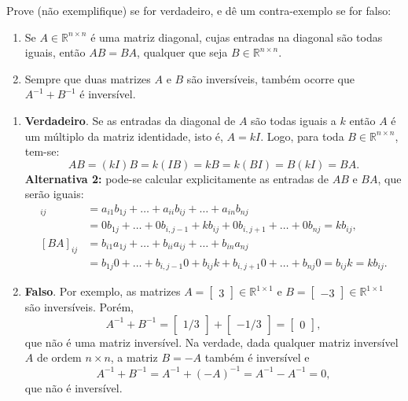 \documentclass[12pt,a4paper]{article}
\newcommand*\R{\mathbb{R}}
\begin{document}
\begin{ExerciseList}
\Exercise[title={2,5}]
Prove (não exemplifique) se for verdadeiro, e dê um contra-exemplo se for falso:
\begin{enumerate}
\item Se $A \in \R^{n \times n}$ é uma matriz diagonal, cujas entradas na diagonal são todas iguais, então $AB = BA$, qualquer que seja $B \in \R^{n \times n}$.
\item Sempre que duas matrizes $A$ e $B$ são inversíveis, também ocorre que $A^{-1} + B^{-1}$ é inversível.
\end{enumerate}
\Answer
\begin{enumerate}
\item \textbf{Verdadeiro}. Se as entradas da diagonal de $A$ são todas iguais a $k$ então $A$ é um múltiplo da matriz identidade, isto é, $A = k I$. Logo, para toda $B \in \R^{n \times n}$, tem-se:
\[
A B = (k I) B = k (I B) = k B = k (B I) = B (k I) = B A.
\]
\textbf{Alternativa 2:} pode-se calcular explicitamente as entradas de $AB$ e $BA$, que serão iguais:
\begin{align*}
[AB]_{ij}
& = a_{i1}b_{1j} + \ldots + a_{ii}b_{ij} + \ldots + a_{in}b_{nj}\\
& = 0 b_{1j} + \ldots + 0 b_{i,j-1} + k b_{ij} + 0b_{i,j+1} + \ldots + 0 b_{nj} = k b_{ij},\\
[BA]_{ij}
& = b_{i1}a_{1j} + \ldots + b_{ii}a_{ij} + \ldots + b_{in}a_{nj}\\
& = b_{1j}0 + \ldots + b_{i,j-1} 0 + b_{ij} k + b_{i,j+1}0 + \ldots + b_{nj}0 = b_{ij} k = k b_{ij}.
\end{align*}

\item \textbf{Falso}. Por exemplo, as matrizes $A = \begin{bmatrix}3\end{bmatrix}\in \R^{1 \times 1}$ e
$B = \begin{bmatrix}-3\end{bmatrix}\in \R^{1 \times 1}$ são inversíveis. Porém,
\[
  A^{-1} + B^{-1}
= \begin{bmatrix}1/3\end{bmatrix}
+ \begin{bmatrix}-1/3\end{bmatrix}
= \begin{bmatrix}0\end{bmatrix},
\]
que não é uma matriz inversível. Na verdade, dada qualquer matriz inversível $A$ de ordem $n \times n$, a matriz $B = -A$ também é inversível e
\[
  A^{-1} + B^{-1}
= A^{-1} + (-A)^{-1}
= A^{-1} - A^{-1}
= 0,
\]
que não é inversível.
\end{enumerate}


\end{ExerciseList}
\end{document}
